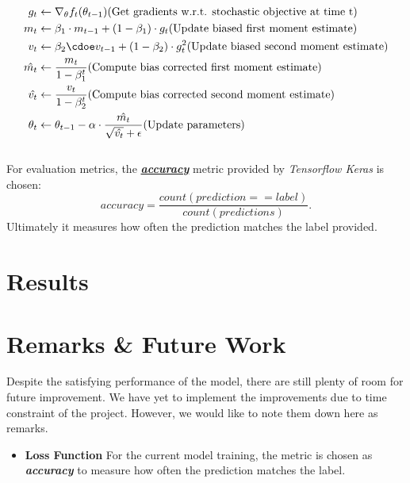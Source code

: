 \documentclass[12pt]{extarticle}
\begin{document}
\begin{equation*}
  \begin{split}
    g_t &\leftarrow \nabla_{\theta} f_t (\theta_{t-1}) \text{(Get gradients w.r.t. stochastic objective at time t)} \\
    m_t &\leftarrow \beta_1 \cdot m_{t-1} + (1-\beta_1) \cdot g_t \text{(Update biased first moment estimate)} \\
    v_t &\leftarrow \beta_2 \cdoe v_{t-1} + (1-\beta_2) \cdot g_t^2 \text{(Update biased second moment estimate)} \\
    \hat{m_{t}} &\leftarrow \frac{m_t}{1 - \beta_1^t} \text{(Compute bias corrected first moment estimate)} \\
    \hat{v_{t}} &\leftarrow \frac{v_t}{1 - \beta_2^t} \text{(Compute bias corrected second moment estimate)} \\
    \theta_t &\leftarrow \theta_{t-1} - \alpha \cdot \frac{\hat{m_t}}{\sqrt{\hat{v_t}} + \epsilon} \text{(Update parameters)}
  \end{split}
\end{equation*}
\\


\noindent For evaluation metrics, the \href{https://github.com/tensorflow/tensorflow/blob/r1.13/tensorflow/python/ops/metrics_impl.py}{\textit{\textbf{accuracy}}}
metric provided by \textit{Tensorflow Keras} is chosen:
$$\textit{accuracy} = \frac{\textit{count}(\textit{prediction} == \textit{label})}{\textit{count}(\textit{predictions})}.$$
Ultimately it measures how often the prediction matches the label provided. \\

\section{Results}


\section{Remarks \& Future Work}
Despite the satisfying performance of the model, there are still plenty of room
for future improvement. We have yet to implement the improvements due to time constraint
of the project. However, we would like to note them down here as remarks.

\begin{itemize}
  \item \textbf{Loss Function} For the current model training, the metric is chosen as \textit{\textbf{accuracy}}
  to measure how often the prediction matches the label.
\end{itemize}
\end{document}
